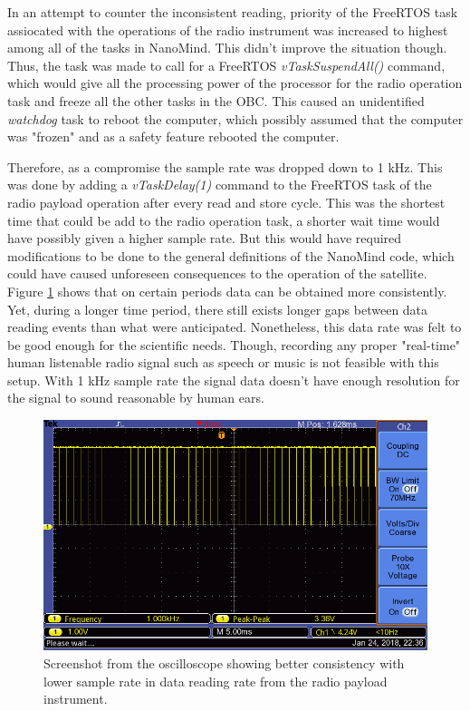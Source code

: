 \documentclass[english,12pt,a4paper,pdftex,elec,utf8]{aaltothesis}
\begin{document}
In an attempt to counter the inconsistent reading, priority of the FreeRTOS task assiocated with the operations of the radio instrument was increased to highest among all of the tasks in NanoMind. This didn't improve the situation though. Thus, the task was made to call for a FreeRTOS \textit{vTaskSuspendAll()} command, which would give all the processing power of the processor for the radio operation task and freeze all the other tasks in the OBC. This caused an unidentified \textit{watchdog} task to reboot the computer, which possibly assumed that the computer was "frozen" and as a safety feature rebooted the computer.\par
Therefore, as a compromise the sample rate was dropped down to 1 kHz. This was done by adding a \textit{vTaskDelay(1)} command to the FreeRTOS task of the radio payload operation after every read and store cycle. This was the shortest time that could be add to the radio operation task, a shorter wait time would have possibly given a higher sample rate. But this would have required modifications to be done to the general definitions of the NanoMind code, which could have caused unforeseen consequences to the operation of the satellite. Figure \ref{payloadosc2} shows that on certain periods data can be obtained more consistently. Yet, during a longer time period, there still exists longer gaps between data reading events than what were anticipated. Nonetheless, this data rate was felt to be good enough for the scientific needs. Though, recording any proper "real-time" human listenable radio signal such as speech or music is not feasible with this setup. With 1 kHz sample rate the signal data doesn't have enough resolution for the signal to sound reasonable by human ears. \par
\begin{figure}[h!]
\centering
\includegraphics[scale=0.5]{F0003TEK}
\caption{Screenshot from the oscilloscope showing better consistency with lower sample rate in data reading rate from the radio payload instrument.}
\label{payloadosc2}
\end{figure}
\end{document}
